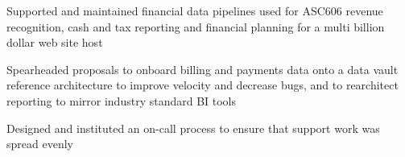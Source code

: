 \begin{job}

  \begin{accomplishments}
    \item Supported and maintained financial data pipelines used for ASC606
    revenue recognition, cash and tax reporting and financial planning for a
    multi billion dollar web site host
  \end{accomplishments}
  \begin{extendedaccomplishments}
    \item Spearheaded proposals to onboard billing and payments data onto a data
    vault reference architecture to improve velocity and decrease bugs, and to
    rearchitect reporting to mirror industry standard BI tools
    \item Designed and instituted an on-call process to ensure that
    support work was spread evenly
  \end{extendedaccomplishments}
\end{job}
